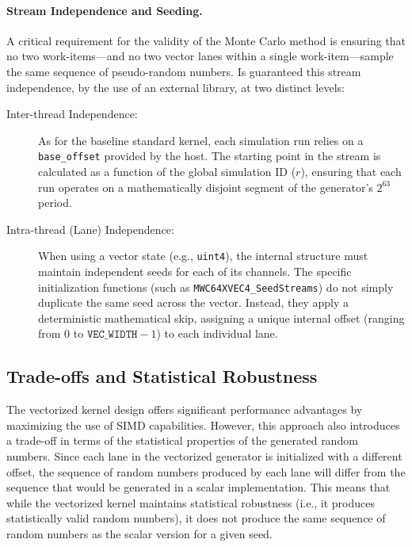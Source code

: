 \paragraph{Stream Independence and Seeding.}
A critical requirement for the validity of the Monte Carlo method is ensuring that no two work-items---and no two vector lanes within a single work-item---sample the same sequence of pseudo-random numbers. Is guaranteed this stream independence, by the use of an external library, at two distinct levels:
\begin{description}
    \item[Inter-thread Independence:] As for the baseline standard kernel, each simulation run relies on a \texttt{base\_offset} provided by the host. The starting point in the stream is calculated as a function of the global simulation ID ($r$), ensuring that each run operates on a mathematically disjoint segment of the generator's $2^{63}$ period.
    
    \item[Intra-thread (Lane) Independence:] When using a vector state (e.g., \texttt{uint4}), the internal structure must maintain independent seeds for each of its channels. The specific initialization functions (such as \texttt{MWC64XVEC4\_SeedStreams}) do not simply duplicate the same seed across the vector. Instead, they apply a deterministic mathematical skip, assigning a unique internal offset (ranging from $0$ to $\texttt{VEC\_WIDTH} - 1$) to each individual lane.
\end{description}

\subsection{Trade-offs and Statistical Robustness}\label{subsec:tradeoffs_statistical_robustness}
The vectorized kernel design offers significant performance advantages by maximizing the use of SIMD capabilities. However, this approach also introduces a trade-off in terms of the statistical properties of the generated random numbers. Since each lane in the vectorized generator is initialized with a different offset, the sequence of random numbers produced by each lane will differ from the sequence that would be generated in a scalar implementation. This means that while the vectorized kernel maintains statistical robustness (i.e., it produces statistically valid random numbers), it does not produce the same sequence of random numbers as the scalar version for a given seed.


